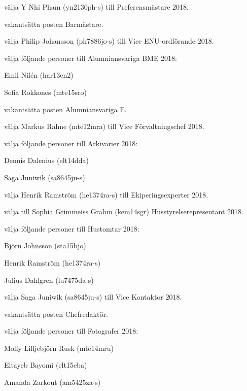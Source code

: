 \documentclass[10pt]{article}
\begin{document}
\begin{paragrafer}
\begin{paralist}
    \Mba välja Y Nhi Pham (yn2130ph-s) till Preferensmästare 2018.

    \Mba vakantsätta posten Barmästare.

    \Mba välja Philip Johansson (ph7886jo-s) till Vice ENU-ordförande 2018.

    \Mba välja följande personer till Alumniansvariga BME 2018:
    \begin{tightdashlist}
      \item Emil Nilén (har13en2)
      \item Sofia Rokkones (mte15sro)
    \end{tightdashlist}

    \Mba vakantsätta posten Alumniansvariga E.

    \Mba välja Markus Rahne (mte12mra) till Vice Förvaltningschef 2018.

    \Mba välja följande personer till Arkivarier 2018:
    \begin{tightdashlist}
        \item Dennis Dalenius (elt14dda)
        \item Saga Juniwik (sa8645ju-s)
    \end{tightdashlist}

    \Mba välja Henrik Ramström (he1374ra-s) till Ekiperingsexperter 2018.

    \Mba välja till Sophia Grimmeiss Grahm (kem14sgr) Husstyrelserepresentant 2018.

    \Mba välja följande personer till Hustomtar 2018:
    \begin{tightdashlist}
        \item Björn Johnsson (sta15bjo)
        \item Henrik Ramström (he1374ra-s)
        \item Julius Dahlgren (lu7475da-s)
    \end{tightdashlist}

    \Mba välja Saga Juniwik (sa8645ju-s) till Vice Kontaktor 2018.

    \Mba vakantsätta posten Chefredaktör.

    \Mba välja följande personer till Fotografer 2018:
    \begin{tightdashlist}
        \item Molly Lilljebjörn Rusk (mte14mru)
        \item Eltayeb Bayomi (elt15eba)
        \item Amanda Zarkout (am5425za-s)
    \end{tightdashlist}


\end{paralist}
\end{paragrafer}
\end{document}
